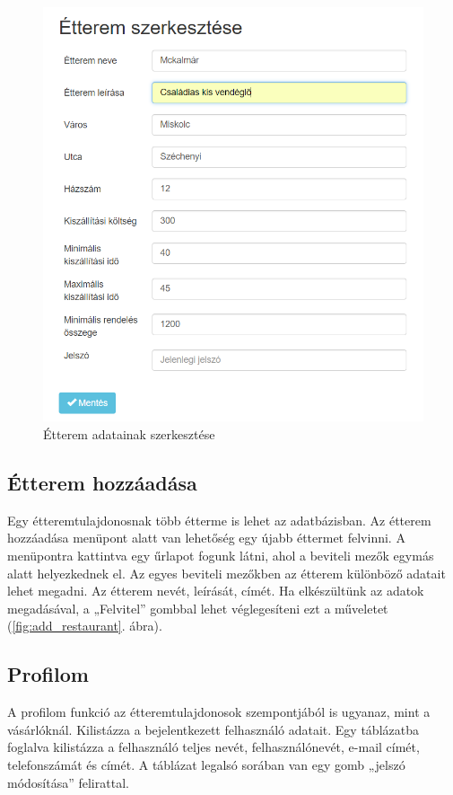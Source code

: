 \begin{figure}
\centering
\includegraphics[scale=0.8]{kepek/edit_restaurant.png}
\caption{Étterem adatainak szerkesztése}
\label{fig:edit_restaurnt}
\end{figure}

\subsection{Étterem hozzáadása}

Egy étteremtulajdonosnak több étterme is lehet az adatbázisban. Az étterem hozzáadása menüpont alatt van lehetőség egy újabb éttermet felvinni. 
A menüpontra kattintva egy űrlapot fogunk látni, ahol a beviteli mezők egymás alatt helyezkednek el. Az egyes beviteli mezőkben az étterem különböző adatait lehet megadni. Az étterem nevét, leírását, címét. Ha elkészültünk az adatok megadásával, a „Felvitel” gombbal lehet véglegesíteni ezt a műveletet (\ref{fig:add_restaurant}. ábra).

\subsection{Profilom}

A profilom funkció az étteremtulajdonosok szempontjából is ugyanaz, mint a vásárlóknál. Kilistázza a bejelentkezett felhasználó adatait. Egy táblázatba foglalva kilistázza a felhasználó teljes nevét, felhasználónevét, e-mail címét, telefonszámát és címét. A táblázat legalsó sorában van egy gomb „jelszó módosítása” felirattal.

